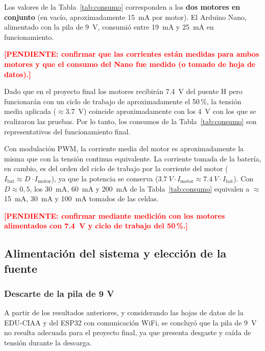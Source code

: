 \documentclass[12pt,a4paper]{article}
\newcommand{\pendiente}[1]{\textcolor{red}{\textbf{[PENDIENTE: #1]}}}
\begin{document}
\begin{visar}
Los valores de la Tabla~\ref{tab:consumo} corresponden a los \textbf{dos motores en conjunto} (en vacío, aproximadamente \SI{15}{mA} por motor). El Arduino Nano, alimentado con la pila de \SI{9}{V}, consumió entre \SI{19}{mA} y \SI{25}{mA} en funcionamiento.
\end{visar}
\pendiente{confirmar que las corrientes están medidas para ambos motores y que el consumo del Nano fue medido (o tomado de hoja de datos).}

Dado que en el proyecto final los motores recibirán \SI{7,4}{V} del puente H pero funcionarán con un ciclo de trabajo de aproximadamente el 50\,\%, la tensión media aplicada ($\approx$\SI{3,7}{V}) coincide aproximadamente con los \SI{4}{V} con los que se realizaron las pruebas. Por lo tanto, los consumos de la Tabla~\ref{tab:consumo} son representativos del funcionamiento final.

\begin{visar}
Con modulación PWM, la corriente media del motor es aproximadamente la misma que con la tensión continua equivalente. La corriente tomada de la batería, en cambio, es del orden del ciclo de trabajo por la corriente del motor ($I_{\text{bat}} \approx D \cdot I_{\text{motor}}$), ya que la potencia se conserva ($\SI{3,7}{V} \cdot I_{\text{motor}} \approx \SI{7,4}{V} \cdot I_{\text{bat}}$). Con $D \approx 0{,}5$, los \SI{30}{mA}, \SI{60}{mA} y \SI{200}{mA} de la Tabla~\ref{tab:consumo} equivalen a $\approx$\SI{15}{mA}, \SI{30}{mA} y \SI{100}{mA} tomados de las celdas.
\end{visar}
\pendiente{confirmar mediante medición con los motores alimentados con \SI{7,4}{V} y ciclo de trabajo del 50\,\%.}

\subsection{Alimentación del sistema y elección de la fuente}
\subsubsection{Descarte de la pila de 9 V}
A partir de los resultados anteriores, y considerando las hojas de datos de la EDU-CIAA y del ESP32 con comunicación WiFi, se concluyó que la pila de \SI{9}{V} no resulta adecuada para el proyecto final, ya que presenta desgaste y caída de tensión durante la descarga.
\end{document}

